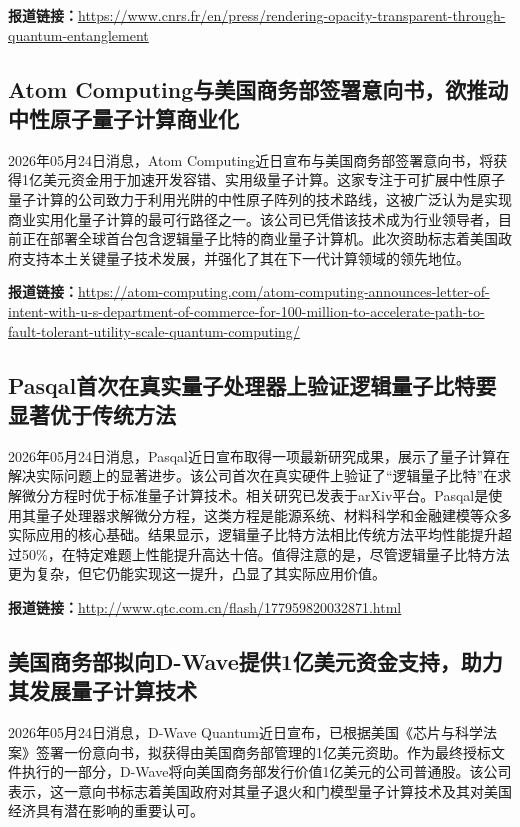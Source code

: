 \documentclass[12pt,a4paper]{ctexart}
\begin{document}
\noindent\textbf{报道链接：}\url{https://www.cnrs.fr/en/press/rendering-opacity-transparent-through-quantum-entanglement}

\subsection{ Atom Computing与美国商务部签署意向书，欲推动中性原子量子计算商业化 }

2026年05月24日消息，Atom Computing近日宣布与美国商务部签署意向书，将获得1亿美元资金用于加速开发容错、实用级量子计算。这家专注于可扩展中性原子量子计算的公司致力于利用光阱的中性原子阵列的技术路线，这被广泛认为是实现商业实用化量子计算的最可行路径之一。该公司已凭借该技术成为行业领导者，目前正在部署全球首台包含逻辑量子比特的商业量子计算机。此次资助标志着美国政府支持本土关键量子技术发展，并强化了其在下一代计算领域的领先地位。

\noindent\textbf{报道链接：}\url{https://atom-computing.com/atom-computing-announces-letter-of-intent-with-u-s-department-of-commerce-for-100-million-to-accelerate-path-to-fault-tolerant-utility-scale-quantum-computing/}

\subsection{ Pasqal首次在真实量子处理器上验证逻辑量子比特要显著优于传统方法 }

2026年05月24日消息，Pasqal近日宣布取得一项最新研究成果，展示了量子计算在解决实际问题上的显著进步。该公司首次在真实硬件上验证了“逻辑量子比特”在求解微分方程时优于标准量子计算技术。相关研究已发表于arXiv平台。Pasqal是使用其量子处理器求解微分方程，这类方程是能源系统、材料科学和金融建模等众多实际应用的核心基础。结果显示，逻辑量子比特方法相比传统方法平均性能提升超过50\%，在特定难题上性能提升高达十倍。值得注意的是，尽管逻辑量子比特方法更为复杂，但它仍能实现这一提升，凸显了其实际应用价值。

\noindent\textbf{报道链接：}\url{http://www.qtc.com.cn/flash/177959820032871.html}

\subsection{ 美国商务部拟向D-Wave提供1亿美元资金支持，助力其发展量子计算技术 }

2026年05月24日消息，D-Wave Quantum近日宣布，已根据美国《芯片与科学法案》签署一份意向书，拟获得由美国商务部管理的1亿美元资助。作为最终授标文件执行的一部分，D-Wave将向美国商务部发行价值1亿美元的公司普通股。该公司表示，这一意向书标志着美国政府对其量子退火和门模型量子计算技术及其对美国经济具有潜在影响的重要认可。
\end{document}

